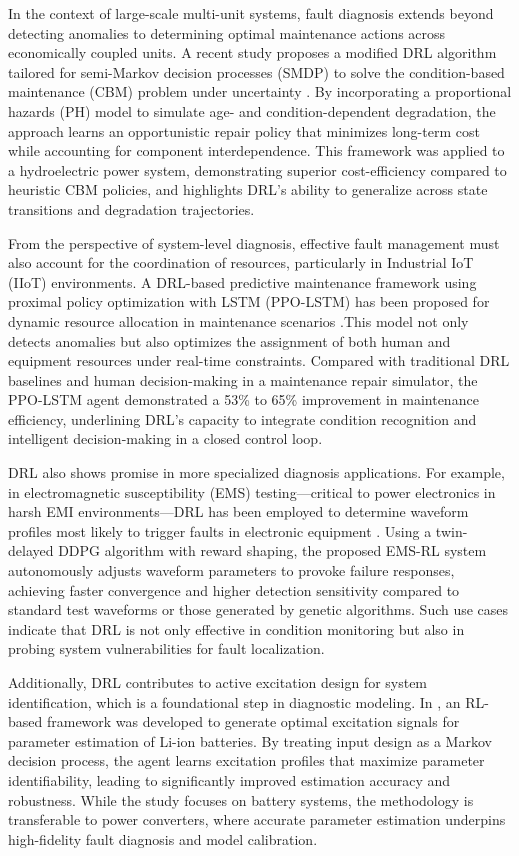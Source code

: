 In the context of large-scale multi-unit systems, fault diagnosis extends beyond detecting anomalies to determining optimal maintenance actions across economically coupled units. A recent study proposes a modified DRL algorithm tailored for semi-Markov decision processes (SMDP) to solve the condition-based maintenance (CBM) problem under uncertainty \cite{najafi2023deep}. By incorporating a proportional hazards (PH) model to simulate age- and condition-dependent degradation, the approach learns an opportunistic repair policy that minimizes long-term cost while accounting for component interdependence. This framework was applied to a hydroelectric power system, demonstrating superior cost-efficiency compared to heuristic CBM policies, and highlights DRL's ability to generalize across state transitions and degradation trajectories.

From the perspective of system-level diagnosis, effective fault management must also account for the coordination of resources, particularly in Industrial IoT (IIoT) environments. A DRL-based predictive maintenance framework using proximal policy optimization with LSTM (PPO-LSTM) has been proposed for dynamic resource allocation in maintenance scenarios \cite{ong2021deep}.This model not only detects anomalies but also optimizes the assignment of both human and equipment resources under real-time constraints. Compared with traditional DRL baselines and human decision-making in a maintenance repair simulator, the PPO-LSTM agent demonstrated a 53\% to 65\% improvement in maintenance efficiency, underlining DRL's capacity to integrate condition recognition and intelligent decision-making in a closed control loop.

DRL also shows promise in more specialized diagnosis applications. For example, in electromagnetic susceptibility (EMS) testing—critical to power electronics in harsh EMI environments—DRL has been employed to determine waveform profiles most likely to trigger faults in electronic equipment \cite{chen2024determining}. Using a twin-delayed DDPG algorithm with reward shaping, the proposed EMS-RL system autonomously adjusts waveform parameters to provoke failure responses, achieving faster convergence and higher detection sensitivity compared to standard test waveforms or those generated by genetic algorithms. Such use cases indicate that DRL is not only effective in condition monitoring but also in probing system vulnerabilities for fault localization.

Additionally, DRL contributes to active excitation design for system identification, which is a foundational step in diagnostic modeling. In \cite{huang2023reinforcement}, an RL-based framework was developed to generate optimal excitation signals for parameter estimation of Li-ion batteries. By treating input design as a Markov decision process, the agent learns excitation profiles that maximize parameter identifiability, leading to significantly improved estimation accuracy and robustness. While the study focuses on battery systems, the methodology is transferable to power converters, where accurate parameter estimation underpins high-fidelity fault diagnosis and model calibration.

